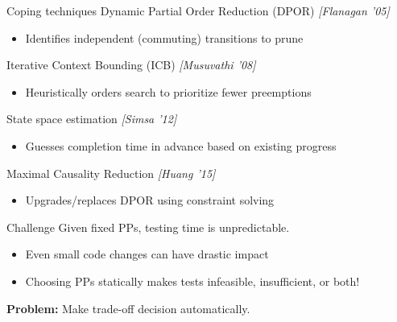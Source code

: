 \documentclass[xcolor=dvipsnames]{beamer}
\begin{document}
\begin{frame}{Coping techniques}
	Dynamic Partial Order Reduction (DPOR) {\em [Flanagan '05]}
	\begin{itemize}
		\item Identifies independent (commuting) transitions to prune
	\end{itemize}
	\pause
	\linegap

	Iterative Context Bounding (ICB) {\em [Musuvathi '08]}
	\begin{itemize}
		\item Heuristically orders search to prioritize fewer preemptions
	\end{itemize}
	\pause
	\linegap

	State space estimation {\em [Simsa '12]}
	\begin{itemize}
		\item Guesses completion time in advance based on existing progress
	\end{itemize}
	\pause
	\linegap

	Maximal Causality Reduction {\em [Huang '15]}
	\begin{itemize}
		\item Upgrades/replaces DPOR using constraint solving
	\end{itemize}
\end{frame}

\begin{frame}{Challenge}
	Given fixed PPs, testing time is unpredictable.
	\begin{itemize}
		\item Even small code changes can have drastic impact
		\item Choosing PPs statically makes tests infeasible, insufficient, or both!
	\end{itemize}
	\linegap

	{\bf Problem:} Make trade-off decision automatically.
\end{frame}



\end{document}
